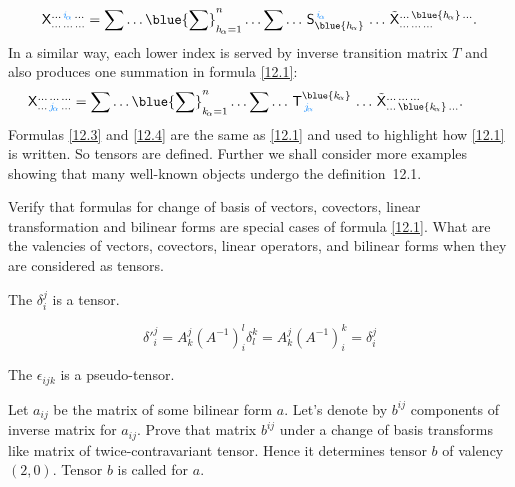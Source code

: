 \begin{equation}
\tsor{X}^{\dots\,\textcolor{Maroon}{i_{\!\scriptscriptstyle\alpha}}\,\dots}_{\dots\,\dots\,
\dots}=\dsum\dots\blue{\dsum}^n_{h_{\!\scriptscriptstyle\alpha}=1}
\dots\dsum\dots\,\tsor{S}^{\,\textcolor{Maroon}{i_{\!\scriptscriptstyle\alpha}}}_{\blue{h_{\!
\scriptscriptstyle\alpha}}}\,\dots\,\tilde{ \tsor{X}}^{\dots\,\blue{h_{\!\scriptscriptstyle\alpha}}\,
\dots}_{\dots\,\dots\,\dots}.
\label{12.3}
\end{equation}
In a similar way, each lower index is served by inverse transition
matrix $T$ and also produces one summation in formula \ref{12.1}:
\begin{equation}
\hskip -2em
\tsor{X}^{\dots\,\dots\,\dots}_{\dots\,\textcolor{Maroon}{j_{\!\scriptscriptstyle\alpha}}\,
\dots}=\dsum\dots\blue{\dsum}^n_{k_{\!\scriptscriptstyle\alpha}=1}
\dots\dsum\dots\,\tsor{T}^{\blue{k_{\!\scriptscriptstyle\alpha}}}_{\,\textcolor{Maroon}{j_{\!
\scriptscriptstyle\alpha}}}\,\dots\,\tilde{ \tsor{X}}^{\dots\,\dots\,\dots}_{\dots\,
\blue{k_{\!\scriptscriptstyle\alpha}}\,\dots}.
\label{12.4}
\end{equation}
Formulas \ref{12.3} and \ref{12.4} are the same as \ref{12.1}
and used to highlight how \ref{12.1} is written. So tensors are
defined. Further we shall consider more examples showing that many
well-known objects undergo the definition~12.1.


\begin{exa}\label{ex:12.1} Verify that formulas  for change of basis of vectors, covectors, linear transformation and bilinear forms are special cases
of formula \ref{12.1}. What are the valencies of vectors, covectors,
linear operators, and bilinear forms when they are considered as
tensors.
\end{exa}


\begin{exa}
 The $\delta_{i}^ j$ is a tensor.
\end{exa}

\begin{solu}
\[ \delta'^j_i=A^j_k(A^{-1})^l_i\delta^k_l=A^j_k(A^{-1})^k_i =\delta^j_i
 \]
\end{solu}



\begin{exa}
  The $\epsilon_{ijk}$ is a pseudo-tensor.
\end{exa}


\begin{exa}\label{ex:12.2} Let $a_{ij}$ be the matrix of some bilinear
form $a$. Let's denote by $b^{ij}$ components of inverse matrix for
$a_{ij}$. Prove that matrix $b^{ij}$ under a change of basis
transforms like matrix of twice-contravariant tensor. Hence it
determines tensor $b$ of valency $(2,0)$. Tensor $b$ is called  for $a$.
\end{exa}




